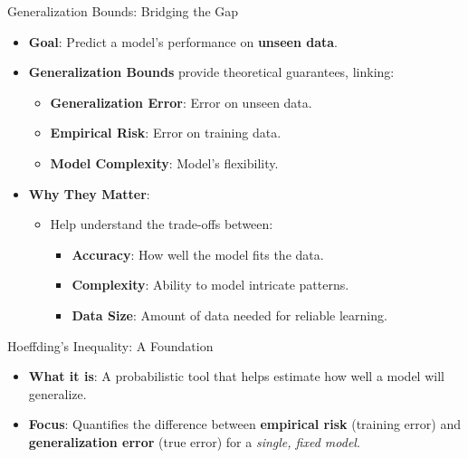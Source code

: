 \documentclass[
  ignorenonframetext,
]{beamer}
\providecommand{\tightlist}{%
  \setlength{\itemsep}{0pt}\setlength{\parskip}{0pt}}\usepackage{longtable,booktabs,array}
\begin{document}
\begin{frame}{Generalization Bounds: Bridging the Gap}
\label{generalization-bounds-bridging-the-gap}
\begin{itemize}
\tightlist
\item
  \textbf{Goal}: Predict a model's performance on \textbf{unseen data}.
\item
  \textbf{Generalization Bounds} provide theoretical guarantees,
  linking:

  \begin{itemize}
  \tightlist
  \item
    \textbf{Generalization Error}: Error on unseen data.
  \item
    \textbf{Empirical Risk}: Error on training data.
  \item
    \textbf{Model Complexity}: Model's flexibility.
  \end{itemize}
\item
  \textbf{Why They Matter}:

  \begin{itemize}
  \tightlist
  \item
    Help understand the trade-offs between:

    \begin{itemize}
    \tightlist
    \item
      \textbf{Accuracy}: How well the model fits the data.
    \item
      \textbf{Complexity}: Ability to model intricate patterns.
    \item
      \textbf{Data Size}: Amount of data needed for reliable learning.
    \end{itemize}
  \end{itemize}
\end{itemize}
\end{frame}

\begin{frame}{Hoeffding's Inequality: A Foundation}
\label{hoeffdings-inequality-a-foundation}
\begin{itemize}
\tightlist
\item
  \textbf{What it is}: A probabilistic tool that helps estimate how well
  a model will generalize.
\item
  \textbf{Focus}: Quantifies the difference between \textbf{empirical
  risk} (training error) and \textbf{generalization error} (true error)
  for a \emph{single, fixed model}.
\end{itemize}
\end{frame}
\end{document}
